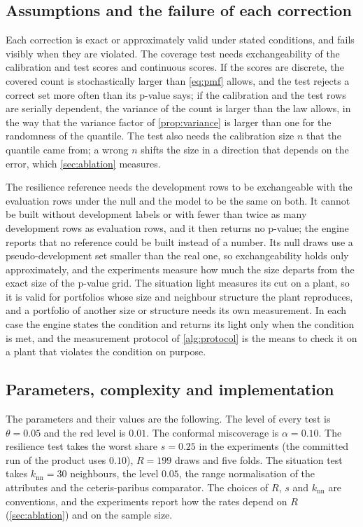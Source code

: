 \subsection{Assumptions and the failure of each correction}

Each correction is exact or approximately valid under stated conditions, and fails visibly when they are violated. The coverage test needs exchangeability of the calibration and test scores and continuous scores. If the scores are discrete, the covered count is stochastically larger than \cref{eq:pmf} allows, and the test rejects a correct set more often than its p-value says; if the calibration and the test rows are serially dependent, the variance of the count is larger than the law allows, in the way that the variance factor of \cref{prop:variance} is larger than one for the randomness of the quantile. The test also needs the calibration size $n$ that the quantile came from; a wrong $n$ shifts the size in a direction that depends on the error, which \cref{sec:ablation} measures.

The resilience reference needs the development rows to be exchangeable with the evaluation rows under the null and the model to be the same on both. It cannot be built without development labels or with fewer than twice as many development rows as evaluation rows, and it then returns no p-value; the engine reports that no reference could be built instead of a number. Its null draws use a pseudo-development set smaller than the real one, so exchangeability holds only approximately, and the experiments measure how much the size departs from the exact size of the p-value grid. The situation light measures its cut on a plant, so it is valid for portfolios whose size and neighbour structure the plant reproduces, and a portfolio of another size or structure needs its own measurement. In each case the engine states the condition and returns its light only when the condition is met, and the measurement protocol of \cref{alg:protocol} is the means to check it on a plant that violates the condition on purpose.

\subsection{Parameters, complexity and implementation}

The parameters and their values are the following. The level of every test is $\theta=0.05$ and the red level is $0.01$. The conformal miscoverage is $\alpha=0.10$. The resilience test takes the worst share $s=0.25$ in the experiments (the committed run of the product uses $0.10$), $R=199$ draws and five folds. The situation test takes $k_{\mathrm{nn}}=30$ neighbours, the level $0.05$, the range normalisation of the attributes and the ceteris-paribus comparator. The choices of $R$, $s$ and $k_{\mathrm{nn}}$ are conventions, and the experiments report how the rates depend on $R$ (\cref{sec:ablation}) and on the sample size.

